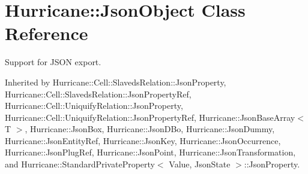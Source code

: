 \hypertarget{classHurricane_1_1JsonObject}{}\section{Hurricane\+:\+:Json\+Object Class Reference}
\label{classHurricane_1_1JsonObject}


Support for J\+S\+ON export.  




Inherited by Hurricane\+::\+Cell\+::\+Slaveds\+Relation\+::\+Json\+Property, Hurricane\+::\+Cell\+::\+Slaveds\+Relation\+::\+Json\+Property\+Ref, Hurricane\+::\+Cell\+::\+Uniquify\+Relation\+::\+Json\+Property, Hurricane\+::\+Cell\+::\+Uniquify\+Relation\+::\+Json\+Property\+Ref, Hurricane\+::\+Json\+Base\+Array$<$ T $>$, Hurricane\+::\+Json\+Box, Hurricane\+::\+Json\+D\+Bo, Hurricane\+::\+Json\+Dummy, Hurricane\+::\+Json\+Entity\+Ref, Hurricane\+::\+Json\+Key, Hurricane\+::\+Json\+Occurrence, Hurricane\+::\+Json\+Plug\+Ref, Hurricane\+::\+Json\+Point, Hurricane\+::\+Json\+Transformation, and Hurricane\+::\+Standard\+Private\+Property$<$ Value, Json\+State $>$\+::\+Json\+Property.

